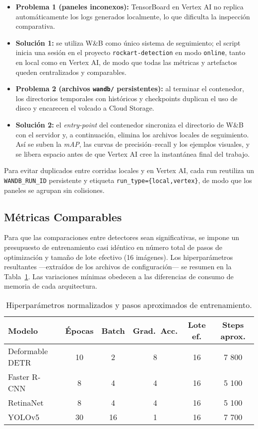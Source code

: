 \begin{itemize}
   \item \textbf{Problema 1 (paneles inconexos):} TensorBoard en Vertex AI no replica automáticamente los logs generados localmente, lo que dificulta la inspección comparativa.
   \item \textbf{Solución 1:} se utiliza W\&B como único sistema de seguimiento; el script inicia una sesión en el proyecto \texttt{rockart-detection} en modo \texttt{online}, tanto en local como en Vertex AI, de modo que todas las métricas y artefactos queden centralizados y comparables.

   \item \textbf{Problema 2 (archivos \texttt{wandb/} persistentes):} al terminar el contenedor, los directorios temporales con históricos y checkpoints duplican el uso de disco y encarecen el volcado a Cloud Storage.
   \item \textbf{Solución 2:} el \emph{entry-point} del contenedor sincroniza el directorio de W\&B con el servidor y, a continuación, elimina los archivos locales de seguimiento.
      Así se suben la \textit{mAP}, las curvas de precisión–recall y los ejemplos visuales, y se libera espacio antes de que Vertex AI cree la instantánea final del trabajo.
\end{itemize}

Para evitar duplicados entre corridas locales y en Vertex AI, cada run reutiliza un \texttt{WANDB\_RUN\_ID} persistente y etiqueta \texttt{run\_type=\{local,vertex\}}, de modo que los paneles se agrupan sin colisiones.

\subsection{Métricas Comparables}\label{ssec:metricas}

Para que las comparaciones entre detectores sean significativas, se impone un presupuesto de entrenamiento casi idéntico en número total de pasos de optimización y tamaño de lote efectivo (16 imágenes).
Los hiperparámetros resultantes —extraídos de los archivos de configuración— se resumen en la Tabla~\ref{tab:train_params}.
Las variaciones mínimas obedecen a las diferencias de consumo de memoria de cada arquitectura.

\begin{table}[ht]
\centering
\caption{Hiperparámetros normalizados y pasos aproximados de entrenamiento.}
\label{tab:train_params}
\begin{tabular}{|l|c|c|c|c|c|}
\hline
\textbf{Modelo} & \textbf{Épocas} & \textbf{Batch} & \textbf{Grad.\ Acc.} & \textbf{Lote ef.} & \textbf{Steps aprox.} \\ \hline
Deformable DETR & 10 & 2  & 8 & 16 & 7 800 \\ \hline
Faster R-CNN    &  8 & 4  & 4 & 16 & 5 100 \\ \hline
RetinaNet       &  8 & 4  & 4 & 16 & 5 100 \\ \hline
YOLOv5          & 30 & 16 & 1 & 16 & 7 700 \\ \hline
\end{tabular}
\end{table}

